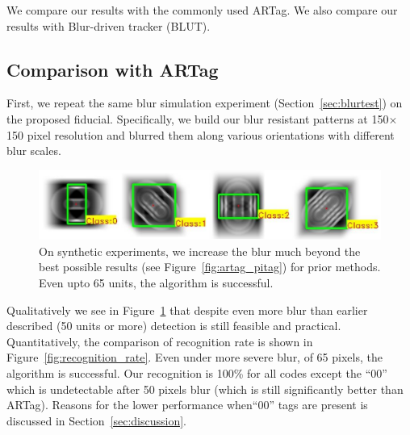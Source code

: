 \documentclass[10pt,twocolumn,letterpaper]{article}
\begin{document}

We compare our results with the commonly used ARTag. We also compare
our results with Blur-driven tracker (BLUT)\cite{Wu:2011}.

\subsection{Comparison with ARTag}
First, we repeat the same blur simulation experiment
(Section~\ref{sec:blurtest}) on the proposed fiducial. Specifically,
we build our blur resistant patterns at 150$\times$150 pixel
resolution and blurred them along various orientations with different
blur scales. 

\begin{figure}[t!]
  \includegraphics[width=\linewidth]{images/blur_maximum.pdf}
  \caption{On synthetic experiments, we increase the blur much beyond
    the best possible results (see Figure~\ref{fig:artag_pitag}) for
    prior methods. Even upto 65 units, the algorithm is successful.}
  \label{fig:blur_maximum}
\end{figure}

Qualitatively we see in Figure~\ref{fig:blur_maximum} that despite
even more blur than earlier described (50 units or more) detection is
still feasible and practical.  Quantitatively, the comparison of
recognition rate is shown in Figure~\ref{fig:recognition_rate}.
Even under more severe blur, of 65 pixels, the algorithm is
successful.  Our recognition is 100\% for all codes except the ``00''
which is undetectable after 50 pixels blur (which is still
significantly better than ARTag).  Reasons for the lower performance
when``00'' tags are present is discussed in
Section~\ref{sec:discussion}.
\end{document}
